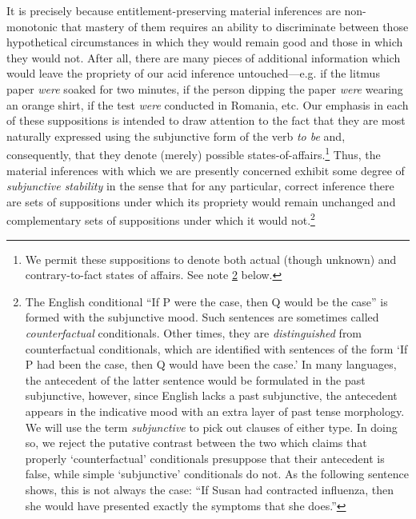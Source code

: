 \documentclass{svjour3}                     %
\begin{document}
It is precisely because entitlement-preserving material inferences are non-monotonic that mastery of them requires an ability to discriminate between those hypothetical circumstances in which they would remain good and those in which they would not.  After all, there are many pieces of additional information which would leave the propriety of our acid inference untouched---e.g. if the litmus paper \textit{were} soaked for two minutes, if the person dipping the paper \textit{were} wearing an orange shirt, if the test \textit{were} conducted in Romania, etc. Our emphasis in each of these suppositions is intended to draw attention to the fact that they are most naturally expressed using the subjunctive form of the verb \textit{to be} and, consequently, that they denote (merely) possible states-of-affairs.\footnote{We permit these suppositions to denote both actual (though unknown) and contrary-to-fact states of affairs. See note \ref{Grammar} below.} Thus, the material inferences with which we are presently concerned exhibit some degree of \textit{subjunctive stability} in the sense that for any particular, correct inference there are sets of suppositions under which its propriety would remain unchanged and complementary sets of suppositions under which it would not.\footnote{\label{Grammar}The English conditional ``If P were the case, then Q would be the case''  is formed with the subjunctive mood. Such sentences are sometimes called \textit{counterfactual} conditionals. Other times, they are \textit{distinguished} from counterfactual conditionals, which are identified with sentences of the form `If P had been the case, then Q would have been the case.' In many languages, the antecedent of the latter sentence would be formulated in the past subjunctive, however, since English lacks a past subjunctive, the antecedent appears in the indicative mood with an extra layer of past tense morphology. We will use the term \textit{subjunctive} to pick out clauses of either type. In doing so, we reject the putative contrast between the two which claims that properly `counterfactual' conditionals presuppose that their antecedent is false, while simple `subjunctive' conditionals do not. As the following sentence shows, this is not always the case: ``If Susan had contracted influenza, then she would have presented exactly the symptoms that she does.''}  
\end{document}
